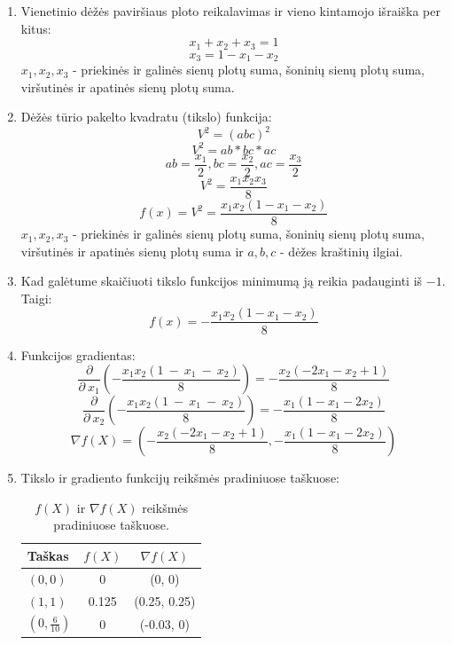\documentclass{VUMIFPSkursinis}
\begin{document}
\begin{enumerate}
  \item Vienetinio dėžės paviršiaus ploto reikalavimas ir vieno kintamojo išraiška per kitus:
        $$x_1 + x_2 + x_3 = 1$$
        $$x_3 = 1 - x_1 - x_2$$
        $x_1, x_2, x_3$ - priekinės ir galinės sienų plotų suma, šoninių sienų plotų suma, viršutinės ir apatinės sienų plotų suma.
  \item Dėžės tūrio pakelto kvadratu (tikslo) funkcija:
        $$V^2 = \left(abc\right)^2$$
        $$V^2 = ab * bc * ac$$
        $$ab = \frac{x_1}{2}, bc = \frac{x_2}{2}, ac = \frac{x_3}{2}$$
        $$V^2 = \frac{x_1x_2x_3}{8}$$
        $$f(x) = V^2 = \frac{x_1x_2(1 - x_1 - x_2)}{8}$$
        $x_1, x_2, x_3$ - priekinės ir galinės sienų plotų suma, šoninių sienų plotų suma, viršutinės ir apatinės sienų plotų suma
        ir $a, b, c$ - dėžes kraštinių ilgiai.
  \item Kad galėtume skaičiuoti tikslo funkcijos minimumą ją reikia padauginti iš $-1$. Taigi:
        $$f(x) = -\frac{x_1x_2(1 - x_1 - x_2)}{8}$$
  \item Funkcijos gradientas:
        $$\frac{\partial }{\partial \:x_1}\left(-\frac{x_1x_2\left(1\:-\:x_1\:-\:x_2\right)}{8}\right) = -\frac{x_2\left(-2x_1-x_2+1\right)}{8}$$
        $$\frac{\partial }{\partial \:x_2}\left(-\frac{x_1x_2\left(1\:-\:x_1\:-\:x_2\right)}{8}\right) = -\frac{x_1\left(1-x_1-2x_2\right)}{8}$$
        $$\nabla f(X) = \left(-\frac{x_2\left(-2x_1-x_2+1\right)}{8},-\frac{x_1\left(1-x_1-2x_2\right)}{8}\right)$$
  \item Tikslo ir gradiento funkcijų reikšmės pradiniuose taškuose:
        \begin{table}[H]
          \centering
          \caption{$f(X)$ ir $\nabla f(X)$ reikšmės pradiniuose taškuose.}
          \begin{tabular}{l c c}
            \hline\hline
            Taškas                         & $f(X)$  & $\nabla f(X)$    \\ [0.5ex]
            \hline
            $(0, 0)$                       & 0       & (0, 0)       \\
            $(1, 1)$                       & 0.125   & (0.25, 0.25)     \\
            $({0}, \frac{6}{10})$ & 0 & (-0.03, 0) \\ [1ex]
            \hline
          \end{tabular}
          \label{table:stpoints}
        \end{table}
\end{enumerate}
\end{document}
